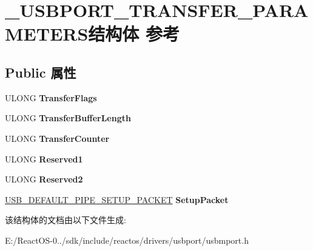 \hypertarget{struct___u_s_b_p_o_r_t___t_r_a_n_s_f_e_r___p_a_r_a_m_e_t_e_r_s}{}\section{\+\_\+\+U\+S\+B\+P\+O\+R\+T\+\_\+\+T\+R\+A\+N\+S\+F\+E\+R\+\_\+\+P\+A\+R\+A\+M\+E\+T\+E\+R\+S结构体 参考}
\label{struct___u_s_b_p_o_r_t___t_r_a_n_s_f_e_r___p_a_r_a_m_e_t_e_r_s}
\subsection*{Public 属性}
\begin{DoxyCompactItemize}
\item 
\mbox{\label{struct___u_s_b_p_o_r_t___t_r_a_n_s_f_e_r___p_a_r_a_m_e_t_e_r_s_a38ee8662df256c13c92d27f4b428a267}} 
U\+L\+O\+NG {\bfseries Transfer\+Flags}
\item 
\mbox{\label{struct___u_s_b_p_o_r_t___t_r_a_n_s_f_e_r___p_a_r_a_m_e_t_e_r_s_a11c589e681d749c00b4ad2c3ed29456f}} 
U\+L\+O\+NG {\bfseries Transfer\+Buffer\+Length}
\item 
\mbox{\label{struct___u_s_b_p_o_r_t___t_r_a_n_s_f_e_r___p_a_r_a_m_e_t_e_r_s_a5b9b8cfc58c760f8d9fc71559fead10b}} 
U\+L\+O\+NG {\bfseries Transfer\+Counter}
\item 
\mbox{\label{struct___u_s_b_p_o_r_t___t_r_a_n_s_f_e_r___p_a_r_a_m_e_t_e_r_s_a6e8cd205203cc87d449ea703f12988b1}} 
U\+L\+O\+NG {\bfseries Reserved1}
\item 
\mbox{\label{struct___u_s_b_p_o_r_t___t_r_a_n_s_f_e_r___p_a_r_a_m_e_t_e_r_s_af7e914957786a02023e4e9147dc091d8}} 
U\+L\+O\+NG {\bfseries Reserved2}
\item 
\mbox{\label{struct___u_s_b_p_o_r_t___t_r_a_n_s_f_e_r___p_a_r_a_m_e_t_e_r_s_a355f743072f6b5fa4787b1904d2f9fa0}} 
\hyperlink{struct___u_s_b___d_e_f_a_u_l_t___p_i_p_e___s_e_t_u_p___p_a_c_k_e_t}{U\+S\+B\+\_\+\+D\+E\+F\+A\+U\+L\+T\+\_\+\+P\+I\+P\+E\+\_\+\+S\+E\+T\+U\+P\+\_\+\+P\+A\+C\+K\+ET} {\bfseries Setup\+Packet}
\end{DoxyCompactItemize}


该结构体的文档由以下文件生成\+:\begin{DoxyCompactItemize}
\item 
E\+:/\+React\+O\+S-\/0../sdk/include/reactos/drivers/usbport/usbmport.\+h\end{DoxyCompactItemize}
